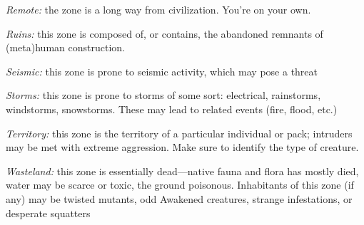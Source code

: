 \documentclass[oneside,10pt]{article}
\begin{document}
\begin{multicols}{2}
\begin{adjustwidth*}{.5cm}{.5cm}
\textit{Remote:} the zone is a long way from civilization. You’re
on your own.

\textit{Ruins:} this zone is composed of, or contains, the abandoned remnants of (meta)human construction.

\textit{Seismic:} this zone is prone to seismic activity, which may
pose a threat

\textit{Storms:} this zone is prone to storms of some sort: electrical, rainstorms, windstorms, snowstorms. These may lead
to related events (fire, flood, etc.)

\textit{Territory:} this zone is the territory of a particular individual
or pack; intruders may be met with extreme aggression.
Make sure to identify the type of creature.

\textit{Wasteland:} this zone is essentially dead—native fauna and
flora has mostly died, water may be scarce or toxic, the
ground poisonous. Inhabitants of this zone (if any) may be
twisted mutants, odd Awakened creatures, strange infestations, or desperate squatters
\end{adjustwidth*}

\end{multicols}

\end{document}
